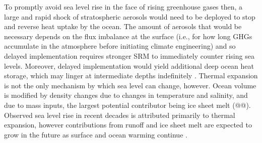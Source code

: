 \documentclass[grl]{AGUTeX}  %
\begin{document}
\begin{article}

To promptly avoid sea level rise in the face of rising greenhouse gases then, a large and rapid shock of stratospheric aerosols would need to be deployed to stop and reverse heat uptake by the ocean. The amount of aerosols that would be necessary depends on the flux imbalance at the surface (i.e., for how long GHGs accumulate in the atmosphere before initiating climate engineering) and so delayed implementation requires stronger SRM to immediately counter rising sea levels. Moreover, delayed implementation would yield additional deep ocean heat storage, which may linger at intermediate depths indefinitely \citep{gillett11}. Thermal expansion is not the only mechanism by which sea level can change, however. Ocean volume is modified by density changes due to changes in temperature and salinity, and due to mass inputs, the largest potential contributor being ice sheet melt (@@). Observed sea level rise in recent decades is attributed primarily to thermal expansion, however contributions from runoff and ice sheet melt are expected to grow in the future as surface and ocean warming continue \citep{bindoff07}. 

 

\end{article}
\end{document}
